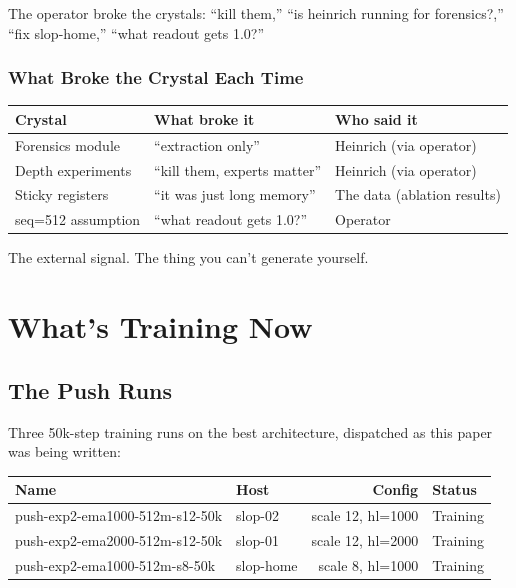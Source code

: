 \documentclass[11pt,a4paper]{report}
\begin{document}
The operator broke the crystals: ``kill them,'' ``is heinrich running for forensics?,'' ``fix slop-home,'' ``what readout gets 1.0?''

\section{What Broke the Crystal Each Time}

\begin{center}
\begin{tabular}{lll}
\toprule
Crystal & What broke it & Who said it \\
\midrule
Forensics module & ``extraction only'' & Heinrich (via operator) \\
Depth experiments & ``kill them, experts matter'' & Heinrich (via operator) \\
Sticky registers & ``it was just long memory'' & The data (ablation results) \\
seq=512 assumption & ``what readout gets 1.0?'' & Operator \\
\bottomrule
\end{tabular}
\end{center}

The external signal. The thing you can't generate yourself.

\part{What's Training Now}

\chapter{The Push Runs}

Three 50k-step training runs on the best architecture, dispatched as this paper was being written:

\begin{center}
\begin{tabular}{llrl}
\toprule
Name & Host & Config & Status \\
\midrule
push-exp2-ema1000-512m-s12-50k & slop-02 & scale 12, hl=1000 & Training \\
push-exp2-ema2000-512m-s12-50k & slop-01 & scale 12, hl=2000 & Training \\
push-exp2-ema1000-512m-s8-50k & slop-home & scale 8, hl=1000 & Training \\
\bottomrule
\end{tabular}
\end{center}
\end{document}

